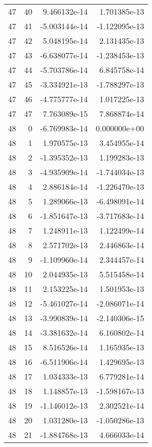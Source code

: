 \begin{tabular}{rrrr}
  47 &   40 &  9.466132e-14 &  1.701385e-13 \\
  47 &   41 & -5.003144e-14 & -1.122095e-13 \\
  47 &   42 &  5.048195e-14 &  2.131435e-13 \\
  47 &   43 & -6.638077e-14 & -1.238453e-13 \\
  47 &   44 & -5.703786e-14 &  6.845758e-14 \\
  47 &   45 & -3.334921e-13 & -1.788297e-13 \\
  47 &   46 & -4.775777e-14 &  1.017225e-13 \\
  47 &   47 &  7.763089e-15 &  7.868874e-14 \\
  48 &    0 & -6.769983e-14 &  0.000000e+00 \\
  48 &    1 &  1.970575e-13 &  3.454955e-14 \\
  48 &    2 & -1.395352e-13 &  1.199283e-13 \\
  48 &    3 & -4.935909e-14 & -1.744034e-13 \\
  48 &    4 &  2.886184e-14 & -1.226470e-13 \\
  48 &    5 &  1.289066e-13 & -6.498091e-14 \\
  48 &    6 & -1.851647e-13 & -3.717683e-14 \\
  48 &    7 &  1.248911e-13 &  1.122499e-14 \\
  48 &    8 &  2.571702e-13 &  2.446863e-14 \\
  48 &    9 & -1.109960e-14 &  2.344457e-14 \\
  48 &   10 &  2.044935e-13 &  5.515458e-14 \\
  48 &   11 &  2.153225e-14 &  1.501953e-13 \\
  48 &   12 & -5.461027e-14 & -2.086071e-14 \\
  48 &   13 & -3.990839e-14 & -2.140306e-15 \\
  48 &   14 & -3.381632e-14 &  6.160802e-14 \\
  48 &   15 &  8.516526e-14 &  1.165935e-13 \\
  48 &   16 & -6.511906e-14 &  1.429695e-13 \\
  48 &   17 &  1.034333e-13 &  6.779281e-14 \\
  48 &   18 &  1.148857e-13 & -1.598167e-13 \\
  48 &   19 & -1.146012e-13 &  2.302521e-14 \\
  48 &   20 &  1.031280e-13 & -1.050286e-13 \\
  48 &   21 & -1.884768e-13 &  4.666033e-14 \\

\end{tabular}
